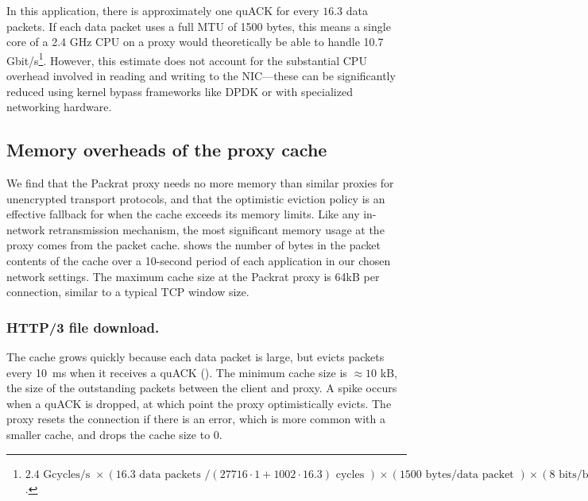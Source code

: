 In this application, there is approximately one quACK for every $16.3$ data
packets. If each data packet uses a full MTU of 1500 bytes, this means a single
core of a 2.4 GHz CPU on a proxy would theoretically be able to handle 10.7
Gbit/s\footnote{ $2.4\text{ Gcycles/s }
\times(16.3 \text{ data packets } / (27716\cdot1 + 1002\cdot16.3) \text{ cycles })
\times (1500 \text{ bytes/data packet })
\times (8 \text{ bits/byte })
= 10.7 \text{ Gbit/s}$.
}. However, this estimate does not account for the substantial CPU overhead
involved in reading and writing to the NIC---these can be significantly reduced
using kernel bypass frameworks like DPDK or with specialized networking
hardware.



\subsection{Memory overheads of the proxy cache}
\label{sec:packrat:emulation:memory-overheads}



We find that the Packrat proxy needs no more memory
than similar proxies for unencrypted transport protocols, and that the optimistic
eviction policy is an effective fallback for when the cache exceeds its memory limits.
Like any in-network retransmission mechanism,
the most significant memory usage at the proxy comes from the packet
cache.  shows the number of bytes in the packet contents of
the cache over a 10-second period of each application in our chosen
network settings. The maximum cache size
at the Packrat proxy is 64kB per connection, similar to a typical TCP window size.

\subsubsection{HTTP/3 file download.}

The cache grows quickly because each data packet is large, but evicts
packets every 10~ms when
it receives a quACK (). The minimum cache size is
$\approx\!10$ kB, the size of the outstanding packets between the client and
proxy. A spike occurs when a quACK is dropped, at which point the proxy
optimistically evicts. The proxy resets the connection if there is an
error, which is more common with a smaller cache, and drops the cache
size to 0.

